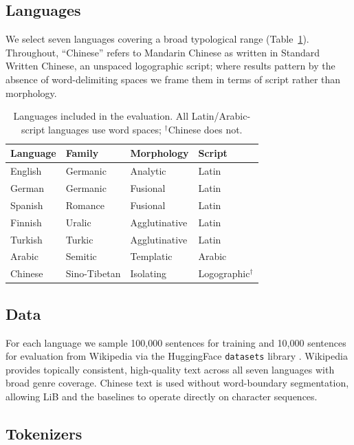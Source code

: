 \documentclass[pdflatex,sn-apa]{sn-jnl}
\begin{document}
\subsection{Languages}

We select seven languages covering a broad typological range
(Table~\ref{tab:langs}).
Throughout, ``Chinese'' refers to Mandarin Chinese as written in Standard
Written Chinese, an unspaced logographic script; where results pattern by the
absence of word-delimiting spaces we frame them in terms of script rather
than morphology.

\begin{table}[h]
\centering
\footnotesize
\begin{tabular}{llll}
\toprule
\textbf{Language} & \textbf{Family} & \textbf{Morphology} & \textbf{Script} \\
\midrule
English  & Germanic     & Analytic      & Latin \\
German   & Germanic     & Fusional      & Latin \\
Spanish  & Romance      & Fusional      & Latin \\
Finnish  & Uralic       & Agglutinative & Latin \\
Turkish  & Turkic       & Agglutinative & Latin \\
Arabic   & Semitic      & Templatic     & Arabic \\
Chinese  & Sino-Tibetan & Isolating     & Logographic$^\dagger$ \\
\bottomrule
\end{tabular}
\caption{Languages included in the evaluation. All Latin/Arabic-script
languages use word spaces; $^\dagger$Chinese does not.}
\label{tab:langs}
\end{table}

\subsection{Data}

For each language we sample 100,000 sentences for training and 10,000
sentences for evaluation from Wikipedia via the HuggingFace \texttt{datasets}
library \citep{lhoest2021datasets}.
Wikipedia provides topically consistent, high-quality text across all seven
languages with broad genre coverage.
Chinese text is used without word-boundary segmentation, allowing LiB and the
baselines to operate directly on character sequences.

\subsection{Tokenizers}
\end{document}
